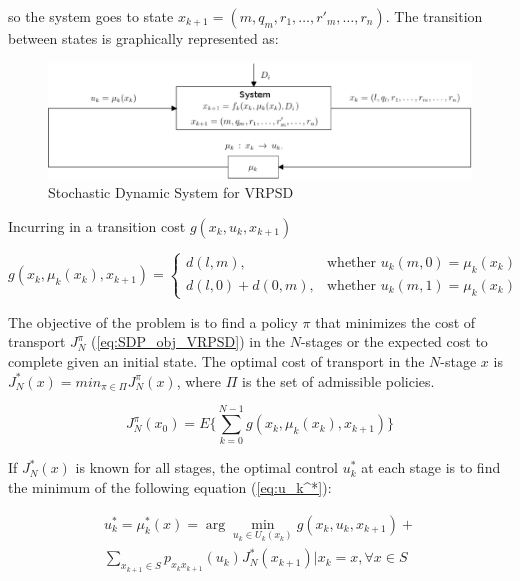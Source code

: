 so the system goes to state $x_{k+1} = (m,q_m,r_1,\ldots,r'_m,\ldots,r_n)$. The transition between states is graphically represented as:

\begin{figure}[!htbp]
  \begin{center}
   \includegraphics[width=1\textwidth]{Images/Chapter2/System_SDP.eps}
  \end{center}
    \caption{Stochastic Dynamic System for VRPSD}\label{fig:SDPS_VRPSD}
\end{figure}

Incurring in a transition cost $g(x_k,u_k,x_{k+1})$

\begin{equation}\label{eq:costg}
    g(x_k,\mu_k(x_k),x_{k+1}) = \left \{ \begin{array}{ll}
    d(l,m), & \text{whether } u_k(m,0)=\mu_k(x_k)\\
    d(l,0) + d(0,m), & \text{whether } u_k(m,1)=\mu_k(x_k)
    \end{array} \right.
 \end{equation}

The objective of the problem is to find a policy $\pi$ that minimizes the cost of transport $J_N^\pi$ (\ref{eq:SDP_obj_VRPSD}) in the $N$-stages or the expected cost to complete given an initial state. The optimal cost of transport in the $N$-stage $x$ is  $J_N^*(x) = min_{\pi\in \Pi}J_N^\pi(x)$, where $\Pi$ is the set of admissible policies. 

\begin{equation}\label{eq:SDP_obj_VRPSD}
 J_N^\pi(x_0)=E\biggr\{\sum_{k=0}^{N-1}g(x_k,\mu_k(x_k),x_{k+1})\biggr\}
\end{equation}

If $J_N^*(x)$ is known for all stages, the optimal control $u_k^*$ at each stage is to find the minimum of the following equation (\ref{eq:u_k^*}):

\begin{multline}\label{eq:u_k^*}
     u_k^*=\mu_k^*(x)=
\arg\min\limits_{u_k \in U_k(x_k)}g(x_k,u_k,x_{k+1})+\\
\sum_{x_{k+1}\in S}p_{x_kx_{k+1}}(u_k)J_N^*(x_{k+1})|x_k=x, \forall x\in S
\end{multline}

